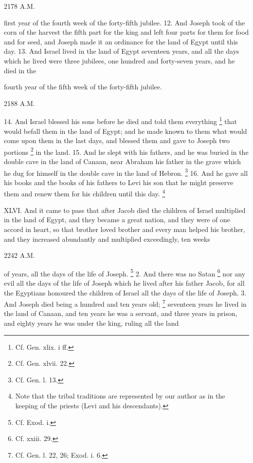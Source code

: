 2178 A.M.

first year of the fourth week of the forty-fifth jubilee. 12. And Joseph took of the corn of the harvest the fifth part for the king and left four parts for them for food and for seed, and Joseph made it an ordinance for the land of Egypt until this day. 13. And Israel lived in the land of Egypt seventeen years, and all the days which he lived were three jubilees, one hundred and forty-seven years, and he died in the

fourth year of the fifth week of the forty-fifth jubilee.

2188 A.M.

14. And Israel blessed his sons before he died and told them everything \footnote{Cf. Gen. xlix. i ff.} that would befall them in the land of Egypt; and he made known to them what would come upon them in the last days, and blessed them and gave to Joseph two portions \footnote{Cf. Gen. xlvii. 22.} in the land. 15. And he slept with his fathers, and he was buried in the double cave in the land of Canaan, near Abraham his father in the grave which he dug for himself in the double cave in the land of Hebron. \footnote{Cf. Gen. l. 13.} 16. And he gave all his books and the books of his fathers to Levi his son that he might preserve them and renew them for his children until this day. \footnote{Note that the tribal traditions are represented by our author as in the keeping of the priests (Levi and his descendants).}


XLVI. And it came to pass that after Jacob died the children of Israel multiplied in the land of Egypt, and they became a great nation, and they were of one accord in heart, so that brother loved brother and every man helped his brother, and they increased abundantly and multiplied exceedingly, ten weeks

2242 A.M.

of years, all the days of the life of Joseph. \footnote{Cf. Exod. i.} 2. And there was no Satan \footnote{Cf. xxiii. 29.} nor any evil all the days of the life of Joseph which he lived after his father Jacob, for all the Egyptians honoured the children of Israel all the days of the life of Joseph. 3. And Joseph died being a hundred and ten years old; \footnote{Cf. Gen. l. 22, 26; Exod. i. 6.} seventeen years he lived in the land of Canaan, and ten years he was a servant, and three years in prison, and eighty years he was under the king, ruling all the land

